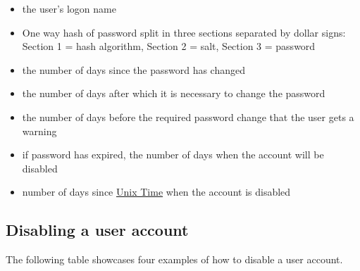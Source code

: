 \begin{itemize}
	\item {} the user's logon name
	\item {} One way hash of password split in three sections separated by dollar signs: Section 1 = hash algorithm, Section 2 = salt, Section 3 = password
	\item {} the number of days since the password has changed
	\item {} the number of days after which it is necessary to change the password
	\item {} the number of days before the required password change that the user gets a warning
	\item {} if password has expired, the number of days when the account will be disabled
	\item {} number of days since \href{https://en.wikipedia.org/wiki/Unix_time}{Unix Time} when the account is disabled
\end{itemize}

\subsection{Disabling a user account}

The following table showcases four examples of how to disable a user account.
 
